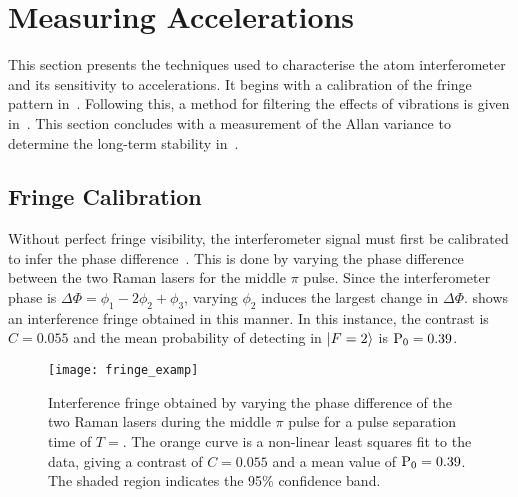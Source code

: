 \section{Measuring Accelerations}\label{sec:atomint_accelerations}
This section presents the techniques used to characterise the atom interferometer
and its sensitivity to accelerations. It begins with a calibration of
the fringe pattern in~. Following this, a
method for filtering the effects of vibrations is given
in~. This section concludes with
a measurement of the Allan variance to determine the long-term
stability in~.
\subsection{Fringe Calibration}\label{sec:fringe_cal}
Without perfect fringe visibility, the interferometer signal must
first be calibrated to infer the phase difference~\cite{Peters2001}. This is done by
varying the phase difference between the two Raman lasers for the
middle \(\pi\) pulse. Since the interferometer phase is \(\Delta \Phi = \phi_1 - 2\phi_2
+\phi_3\), varying \(\phi_2\) induces the largest change in
\(\Delta\Phi\).  shows an interference fringe obtained in this
manner. In this instance, the contrast is \(C = 0.055\) and the mean
probability of detecting in \(\ket{F=2}\) is \(\textnormal{P}_0 =
0.39\).
\begin{figure}[htpb!]
  \centering
  \texttt{[image: fringe\_examp]}
  \caption[Interference fringe for \(T = \).]{Interference fringe obtained by varying the phase
    difference of the two Raman lasers during the middle \(\pi\) pulse
    for a pulse separation time of \(T = \). The orange
curve is a non-linear least squares fit to the data, giving a contrast
of \(C = 0.055\) and a mean value of \(\textnormal{P}_0 = 0.39\). The
shaded region indicates the 95\% confidence band. }
  \label{fig:fringe_examp}
\end{figure}


